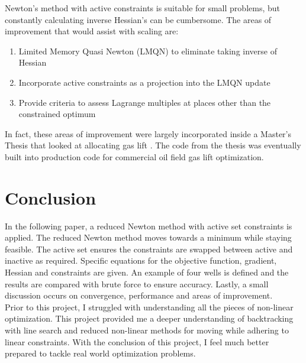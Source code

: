 \documentclass{article}
\begin{document}
Newton's method with active constraints is suitable for small problems, but constantly calculating inverse Hessian's can be cumbersome. The areas of improvement that would assist with scaling are:

\begin{enumerate}
    \item Limited Memory Quasi Newton (LMQN) to eliminate taking inverse of Hessian
    \item Incorporate active constraints as a projection into the LMQN update
    \item Provide criteria to assess Lagrange multiples at places other than the constrained optimum
\end{enumerate}

In fact, these areas of improvement were largely incorporated inside a Master's Thesis that looked at allocating gas lift \cite{gas_lift_quasi_thesis}. The code from the thesis was eventually built into production code for commercial oil field gas lift optimization.\\

\section{Conclusion}

In the following paper, a reduced Newton method with active set constraints is applied. The reduced Newton method moves towards a minimum while staying feasible. The active set ensures the constraints are swapped between active and inactive as required. Specific equations for the objective function, gradient, Hessian and constraints are given. An example of four wells is defined and the results are compared with brute force to ensure accuracy. Lastly, a small discussion occurs on convergence, performance and areas of improvement.\\

Prior to this project, I struggled with understanding all the pieces of non-linear optimization. This project provided me a deeper understanding of backtracking with line search and reduced non-linear methods for moving while adhering to linear constraints. With the conclusion of this project, I feel much better prepared to tackle real world optimization problems.

\printbibliography
\end{document}
